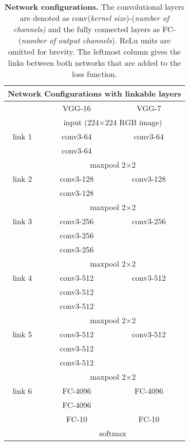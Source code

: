 \documentclass[10pt,twocolumn,letterpaper]{article}
\begin{document}
\begin{table}
	\begin{center}
	\begin{tabular}{|c|c|c|}
		\hline
		\multicolumn{3}{|c|}{Network Configurations with linkable layers} \\ \hline
			&	VGG-16	&	VGG-7	\\ \hline
			\hline
		& \multicolumn{2}{c|}{input (224$\times$224 RGB image)} \\ \hline
		link 1	&	conv3-64	&	conv3-64	\\ 
			& 	conv3-64	&		\\ \hline
		
			& \multicolumn{2}{c|}{maxpool 2$\times$2} \\ \hline
		link 2	&	conv3-128	&	conv3-128	\\ 
			& 	conv3-128	&		\\ \hline
			
			& \multicolumn{2}{c|}{maxpool 2$\times$2} \\ \hline
		link 3	&	conv3-256	&	conv3-256	\\ 
			& 	conv3-256	&		\\ 
			& 	conv3-256	&		\\ \hline
			& \multicolumn{2}{c|}{maxpool 2$\times$2} \\ \hline
		link 4	&	conv3-512	&	conv3-512	\\ 
			& 	conv3-512	&		\\ 
			& 	conv3-512	&		\\ \hline
			& \multicolumn{2}{c|}{maxpool 2$\times$2} \\ \hline
		link 5	&	conv3-512	&	conv3-512	\\ 
			& 	conv3-512	&		\\ 
			& 	conv3-512	&		\\ \hline
			& \multicolumn{2}{c|}{maxpool 2$\times$2} \\ \hline
		link 6	&	FC-4096	&	FC-4096	\\ 
			& 	FC-4096	&		\\ 
			& 	FC-10	&	FC-10	\\ \hline
			& \multicolumn{2}{c|}{softmax} \\ \hline
			
	\end{tabular}
	\end{center}
	\label{tab:network_architectures}
	\caption{\textbf{Network configurations.} The convolutional layers are denoted as conv(\textit{kernel size})-(\textit{number of channels)} and the fully 		connected layers as FC-(\textit{number of output channels}). ReLu units are omitted for brevity. The leftmost column gives the links between both networks that are added to the loss function.}
\end{table}
\end{document}
